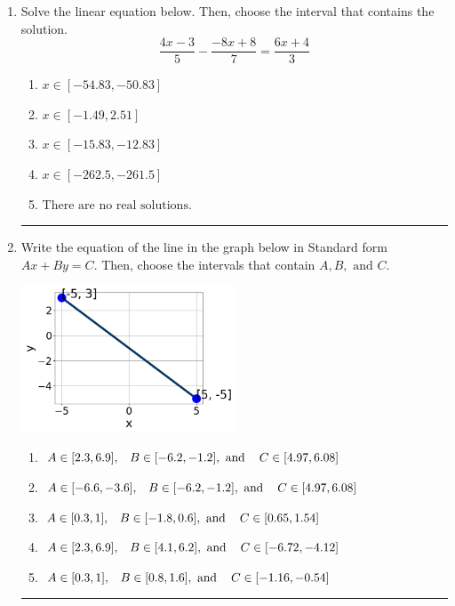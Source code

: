 \documentclass[14pt]{extbook}
\newcommand{\litem}[1]{\item#1\hspace*{-1cm}\rule{\textwidth}{0.4pt}}
\begin{document}
\begin{enumerate}
{\begin{enumerate}[label=\Alph*.]
\end{enumerate} }
\litem{
Solve the linear equation below. Then, choose the interval that contains the solution.\[ \frac{4x -3}{5} - \frac{-8x + 8}{7} = \frac{6x + 4}{3} \]\begin{enumerate}[label=\Alph*.]
\item \( x \in [-54.83, -50.83] \)
\item \( x \in [-1.49, 2.51] \)
\item \( x \in [-15.83, -12.83] \)
\item \( x \in [-262.5, -261.5] \)
\item \( \text{There are no real solutions.} \)

\end{enumerate} }
\litem{
Write the equation of the line in the graph below in Standard form $Ax+By=C$. Then, choose the intervals that contain $A, B, \text{ and } C$.
\begin{center}
    \includegraphics[width=0.5\textwidth]{../Figures/linearGraphToStandardA.png}
\end{center}
\begin{enumerate}[label=\Alph*.]
\item \( A \in [2.3, 6.9], \hspace{3mm} B \in [-6.2, -1.2], \text{ and } \hspace{3mm} C \in [4.97, 6.08] \)
\item \( A \in [-6.6, -3.6], \hspace{3mm} B \in [-6.2, -1.2], \text{ and } \hspace{3mm} C \in [4.97, 6.08] \)
\item \( A \in [0.3, 1], \hspace{3mm} B \in [-1.8, 0.6], \text{ and } \hspace{3mm} C \in [0.65, 1.54] \)
\item \( A \in [2.3, 6.9], \hspace{3mm} B \in [4.1, 6.2], \text{ and } \hspace{3mm} C \in [-6.72, -4.12] \)
\item \( A \in [0.3, 1], \hspace{3mm} B \in [0.8, 1.6], \text{ and } \hspace{3mm} C \in [-1.16, -0.54] \)


\end{enumerate}}
\end{enumerate}
\end{document}
